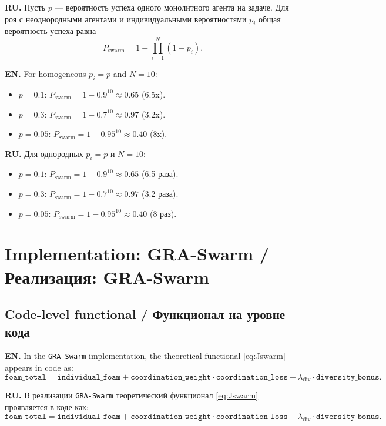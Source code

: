 \documentclass[11pt,a4paper]{article}
\begin{document}
\textbf{RU.}
Пусть $p$ --- вероятность успеха одного монолитного агента на задаче.
Для роя с неоднородными агентами и индивидуальными вероятностями $p_i$ общая вероятность успеха равна
\begin{equation}
P_{\text{swarm}} = 1 - \prod_{i=1}^{N} (1 - p_i).
\end{equation}

\textbf{EN.}
For homogeneous $p_i = p$ and $N=10$:
\begin{itemize}
\item $p=0.1$: $P_{\text{swarm}} = 1 - 0.9^{10} \approx 0.65$ (6.5x).
\item $p=0.3$: $P_{\text{swarm}} = 1 - 0.7^{10} \approx 0.97$ (3.2x).
\item $p=0.05$: $P_{\text{swarm}} = 1 - 0.95^{10} \approx 0.40$ (8x).
\end{itemize}

\textbf{RU.}
Для однородных $p_i = p$ и $N=10$:
\begin{itemize}
\item $p=0.1$: $P_{\text{swarm}} = 1 - 0.9^{10} \approx 0.65$ (6.5 раза).
\item $p=0.3$: $P_{\text{swarm}} = 1 - 0.7^{10} \approx 0.97$ (3.2 раза).
\item $p=0.05$: $P_{\text{swarm}} = 1 - 0.95^{10} \approx 0.40$ (8 раз).
\end{itemize}

\section{Implementation: GRA-Swarm / Реализация: GRA-Swarm}

\subsection{Code-level functional / Функционал на уровне кода}

\textbf{EN.}
In the \texttt{GRA-Swarm} implementation, the theoretical functional \eqref{eq:Jswarm} appears in code as:
\begin{equation}
\texttt{foam\_total} = \texttt{individual\_foam} + \texttt{coordination\_weight} \cdot \texttt{coordination\_loss} - \lambda_{\text{div}} \cdot \texttt{diversity\_bonus}.
\label{eq:foam_code}
\end{equation}

\textbf{RU.}
В реализации \texttt{GRA-Swarm} теоретический функционал \eqref{eq:Jswarm} проявляется в коде как:
\begin{equation}
\texttt{foam\_total} = \texttt{individual\_foam} + \texttt{coordination\_weight} \cdot \texttt{coordination\_loss} - \lambda_{\text{div}} \cdot \texttt{diversity\_bonus}.
\end{equation}
\end{document}
